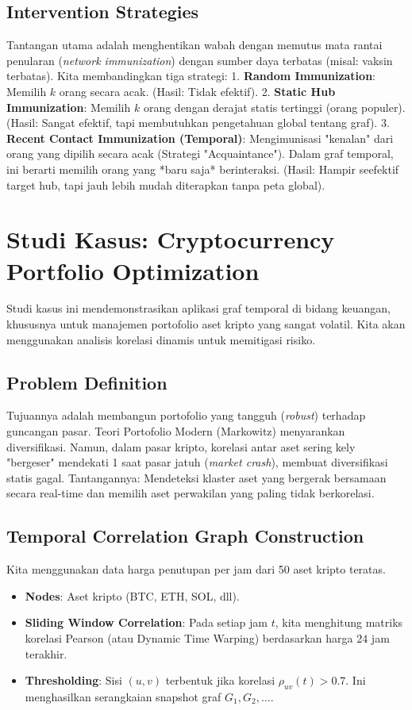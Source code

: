 \documentclass[12pt,a4paper]{book}
\begin{document}
\section{Intervention Strategies}
Tantangan utama adalah menghentikan wabah dengan memutus mata rantai penularan (\textit{network immunization}) dengan sumber daya terbatas (misal: vaksin terbatas).
Kita membandingkan tiga strategi:
1.  \textbf{Random Immunization}: Memilih $k$ orang secara acak. (Hasil: Tidak efektif).
2.  \textbf{Static Hub Immunization}: Memilih $k$ orang dengan derajat statis tertinggi (orang populer). (Hasil: Sangat efektif, tapi membutuhkan pengetahuan global tentang graf).
3.  \textbf{Recent Contact Immunization (Temporal)}: Mengimunisasi "kenalan" dari orang yang dipilih secara acak (Strategi "Acquaintance"). Dalam graf temporal, ini berarti memilih orang yang *baru saja* berinteraksi. (Hasil: Hampir seefektif target hub, tapi jauh lebih mudah diterapkan tanpa peta global).

\chapter{Studi Kasus: Cryptocurrency Portfolio Optimization}
Studi kasus ini mendemonstrasikan aplikasi graf temporal di bidang keuangan, khususnya untuk manajemen portofolio aset kripto yang sangat volatil. Kita akan menggunakan analisis korelasi dinamis untuk memitigasi risiko.

\section{Problem Definition}
Tujuannya adalah membangun portofolio yang tangguh (\textit{robust}) terhadap guncangan pasar.
Teori Portofolio Modern (Markowitz) menyarankan diversifikasi. Namun, dalam pasar kripto, korelasi antar aset sering kely "bergeser" mendekati 1 saat pasar jatuh (\textit{market crash}), membuat diversifikasi statis gagal.
Tantangannya: Mendeteksi klaster aset yang bergerak bersamaan secara real-time dan memilih aset perwakilan yang paling tidak berkorelasi.

\section{Temporal Correlation Graph Construction}
Kita menggunakan data harga penutupan per jam dari 50 aset kripto teratas.
\begin{itemize}
    \item \textbf{Nodes}: Aset kripto (BTC, ETH, SOL, dll).
    \item \textbf{Sliding Window Correlation}: Pada setiap jam $t$, kita menghitung matriks korelasi Pearson (atau Dynamic Time Warping) berdasarkan harga $24$ jam terakhir.
    \item \textbf{Thresholding}: Sisi $(u, v)$ terbentuk jika korelasi $\rho_{uv}(t) > 0.7$. Ini menghasilkan serangkaian snapshot graf $G_1, G_2, \dots$.
\end{itemize}
\end{document}
